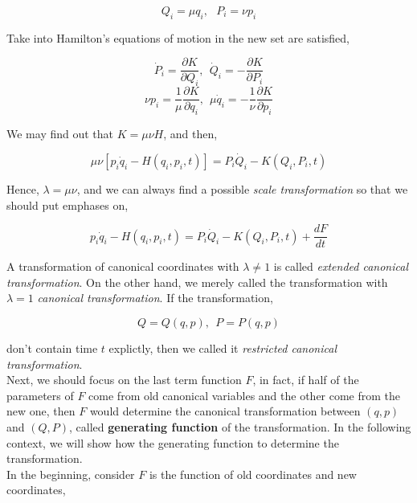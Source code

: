 \documentclass[12pt]{article}
\begin{document}
\begin{center}
    \[ Q_i = \mu q_i,\ \ \ P_i = \nu p_i \]
\end{center}

Take into Hamilton's equations of motion in the new set are satisfied,

\begin{center}
    \[ \dot{P}_i = \frac{\partial K}{\partial Q_i},\ \ \dot{Q}_i = - \frac{\partial K}{\partial P_i} \]
    \[ \nu p_i = \frac{1}{\mu} \frac{\partial K}{\partial q_i},\ \ \mu \dot{q}_i = -\frac{1}{\nu} \frac{\partial K}{\partial p_i} \]
\end{center}

We may find out that $K = \mu \nu H$, and then,

\begin{center}
    \[ \mu \nu \left[ p_i\dot{q}_i - H(q_i, p_i, t) \right] = P_i\dot{Q}_i - K(Q_i, P_i, t) \]
\end{center}

Hence, $\lambda = \mu \nu$, and we can always find a possible \textit{scale transformation} so that we should put emphases on,

\begin{center}
    \[ p_i\dot{q}_i - H(q_i, p_i, t) = P_i\dot{Q}_i - K(Q_i, P_i, t) + \frac{dF}{dt} \]
\end{center}

A transformation of canonical coordinates with $\lambda \ne 1$ is called \textit{extended canonical transformation}. On the other hand, we merely called the transformation with $\lambda = 1$ \textit{canonical transformation}. If the transformation, 

\begin{center}
    \[ Q = Q(q, p),\ \ P = P(q, p) \]
\end{center}

\noindent don't contain time $t$ explictly, then we called it \textit{restricted canonical transformation}.
\\
\indent Next, we should focus on the last term function $F$, in fact, if half of the parameters of $F$ come from old canonical variables and the other come from the new one, then $F$ would determine the canonical transformation between $(q, p)$ and $(Q, P)$, called \textbf{generating function} of the transformation. In the following context, we will show how the generating function to determine the transformation.
\\
\indent In the beginning, consider $F$ is the function of old coordinates and new coordinates,
\end{document}
